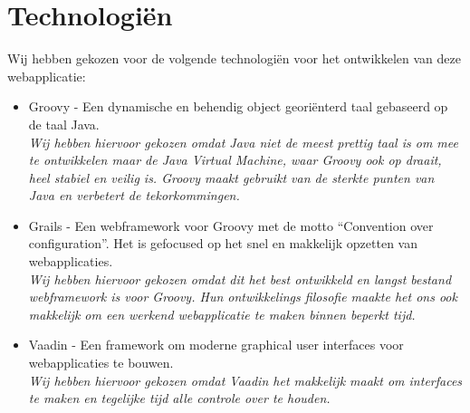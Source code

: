 \chapter{Technologi\"en}

Wij hebben gekozen voor de volgende technologi\"en voor het ontwikkelen van deze webapplicatie:
\begin{itemize}
	\item Groovy - Een dynamische en behendig object geori\"enterd taal gebaseerd op de taal Java.
	\vspace{2mm} \\
	\textit{Wij hebben hiervoor gekozen omdat Java niet de meest prettig taal is om mee te ontwikkelen maar de Java Virtual Machine, waar Groovy ook op draait, heel stabiel en veilig is. Groovy maakt gebruikt van de sterkte punten van Java en verbetert de tekorkommingen.}

	\item Grails - Een webframework voor Groovy met de motto ``Convention over configuration''. Het is gefocused op het snel en makkelijk opzetten van webapplicaties.
	\vspace{2mm} \\
	\textit{Wij hebben hiervoor gekozen omdat dit het best ontwikkeld en langst bestand webframework is voor Groovy. Hun ontwikkelings filosofie maakte het ons ook makkelijk om een werkend webapplicatie te maken binnen beperkt tijd.}

	\item Vaadin - Een framework om moderne graphical user interfaces voor webapplicaties te bouwen.
	\vspace{2mm} \\
	\textit{Wij hebben hiervoor gekozen omdat Vaadin het makkelijk maakt om interfaces te maken en tegelijke tijd alle controle over te houden.}
\end{itemize}